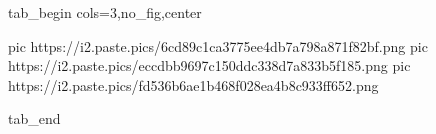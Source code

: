  
 
 
 
 


\ifcmt
  tab_begin cols=3,no_fig,center

     pic https://i2.paste.pics/6cd89c1ca3775ee4db7a798a871f82bf.png
		 pic https://i2.paste.pics/eccdbb9697c150ddc338d7a833b5f185.png
		 pic https://i2.paste.pics/fd536b6ae1b468f028ea4b8c933ff652.png

  tab_end
\fi
